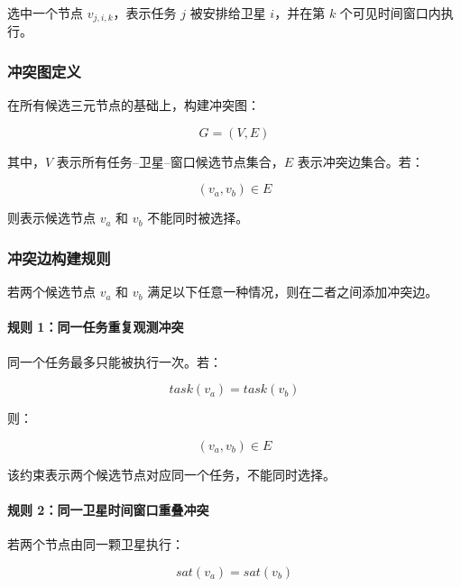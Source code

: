 \documentclass[UTF8,a4paper,12pt]{ctexart}
\begin{document}
选中一个节点 $v_{j,i,k}$，表示任务 $j$ 被安排给卫星 $i$，并在第 $k$ 个可见时间窗口内执行。

\subsubsection{冲突图定义}

在所有候选三元节点的基础上，构建冲突图：

\begin{equation}
G=(V,E)
\end{equation}

其中，$V$ 表示所有任务--卫星--窗口候选节点集合，$E$ 表示冲突边集合。若：

\begin{equation}
(v_a,v_b)\in E
\end{equation}

则表示候选节点 $v_a$ 和 $v_b$ 不能同时被选择。

\subsubsection{冲突边构建规则}

若两个候选节点 $v_a$ 和 $v_b$ 满足以下任意一种情况，则在二者之间添加冲突边。

\paragraph{规则 1：同一任务重复观测冲突}

同一个任务最多只能被执行一次。若：

\begin{equation}
task(v_a)=task(v_b)
\end{equation}

则：

\begin{equation}
(v_a,v_b)\in E
\end{equation}

该约束表示两个候选节点对应同一个任务，不能同时选择。

\paragraph{规则 2：同一卫星时间窗口重叠冲突}

若两个节点由同一颗卫星执行：

\begin{equation}
sat(v_a)=sat(v_b)
\end{equation}
\end{document}
